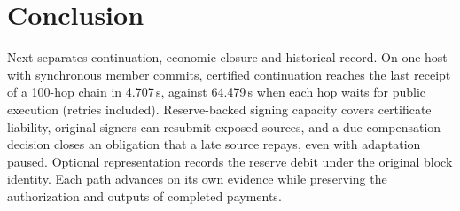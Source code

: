 \section{Conclusion}
\label{sec:conclusion}

Next separates continuation, economic closure and historical record. On one host
with synchronous member commits, certified continuation reaches the last receipt of a
100-hop chain in 4.707\,s, against 64.479\,s when each hop waits for public execution
(retries included). Reserve-backed signing capacity covers certificate liability,
original signers can resubmit exposed sources, and a due compensation decision closes
an obligation that a late source repays, even with adaptation paused. Optional
representation records the reserve debit under the original block identity. Each path advances on its own evidence while preserving the authorization and outputs of completed payments.

